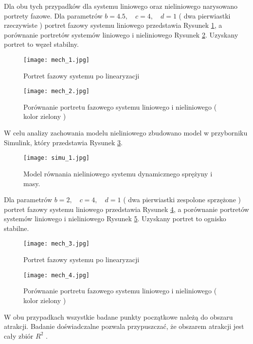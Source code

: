 \documentclass[a4paper,11pt]{article}
\begin{document}
Dla obu tych przypadków dla systemu liniowego oraz nieliniowego narysowano portrety fazowe. Dla parametrów \(b=4.5,\quad c=4,\quad d=1\) ( dwa pierwiastki rzeczywiste ) portret fazowy systemu liniowego przedstawia Rysunek \ref{fig:mech_1}, a porównanie portretów systemów liniowego i nieliniowego Rysunek \ref{fig:mech_2}. Uzyskany portret to węzeł stabilny. 
\begin{figure}[h!]
\centerline{\texttt{[image: mech\_1.jpg]}}
\centering
\caption{Portret fazowy systemu po linearyzacji}
\label{fig:mech_1}
\end{figure}
\begin{figure}[h!]
\centerline{\texttt{[image: mech\_2.jpg]}}
\caption{Porównanie portretu fazowego systemu liniowego i nieliniowego ( kolor zielony )}
\label{fig:mech_2}
\end{figure}
\newpage
W celu analizy zachowania modelu nieliniowego zbudowano model w przyborniku Simulink, który przedstawia Rysunek \ref{fig:simu_1}.
\begin{figure}[!]
\centerline{\texttt{[image: simu\_1.jpg]}}
\centering
\caption{Model równania nieliniowego systemu dynamicznego sprężyny i masy.}
\label{fig:simu_1}
\end{figure}

Dla parametrów \(b=2,\quad c=4,\quad d=1\) ( dwa pierwiastki zespolone sprzężone ) portret fazowy systemu liniowego przedstawia Rysunek \ref{fig:mech_3}, a porównanie portretów systemów liniowego i nieliniowego Rysunek \ref{fig:mech_4}. Uzyskany portret to ognisko stabilne.
\begin{figure}[h!]
\centerline{\texttt{[image: mech\_3.jpg]}}
\centering
\caption{Portret fazowy systemu po linearyzacji}
\label{fig:mech_3}
\end{figure}
\begin{figure}[h!]
\centerline{\texttt{[image: mech\_4.jpg]}}
\caption{Porównanie portretu fazowego systemu liniowego i nieliniowego ( kolor zielony )}
\label{fig:mech_4}
\end{figure}
\newpage

W obu przypadkach wszystkie badane punkty początkowe należą do obszaru atrakcji. Badanie doświadczalne pozwala przypuszczać, że obszarem atrakcji jest cały zbiór \(R^{2}\) . 
\end{document}
